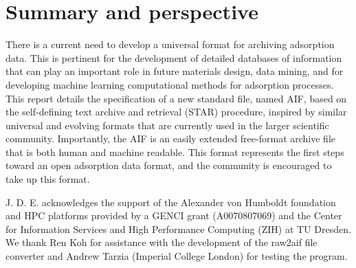 \documentclass[journal=langd5,manuscript=article]{achemso}
\begin{document}
\section{Summary and perspective}
There is a current need to develop a universal format for archiving adsorption data.
This is pertinent for the development of detailed databases of information that can play an important role in future materials design, data mining, and for developing machine learning computational methods for adsorption processes.\cite{10.1021/acs.chemmater.9b03376}
This report details the specification of a new standard file, named AIF, based on the self-defining text archive and retrieval (STAR) procedure, inspired by similar universal and evolving formats that are currently used in the larger scientific community.
Importantly, the AIF is an easily extended free-format archive file that is both human and machine readable.
This format represents the first steps toward an open adsorption data format, and the community is encouraged to take up this format.



\begin{acknowledgement}
  J. D. E. acknowledges the support of the Alexander von Humboldt foundation and HPC platforms provided by a GENCI grant (A0070807069) and the Center for Information Services and High Performance Computing (ZIH) at TU Dresden.
  We thank Ren Koh for assistance with the development of the raw2aif file converter and Andrew Tarzia (Imperial College London) for testing the program.
\end{acknowledgement}





\end{document}
